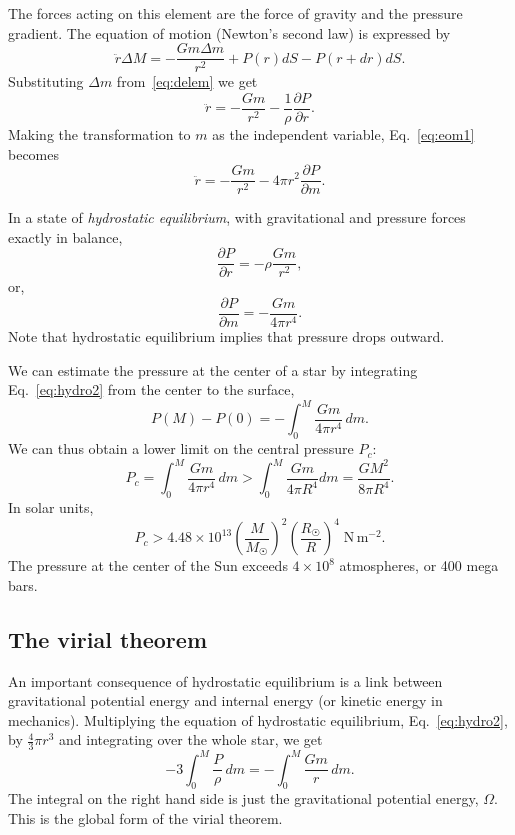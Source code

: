 \documentclass[]{article}
\newcommand{\unit}[1]{\;\mathrm{#1}}
\newcommand{\Sun}{\astrosun}
\newcommand{\di}{\partial} %
\begin{document}
The forces acting on this element are the force of gravity and the pressure
gradient. The equation of motion (Newton's second law) is expressed by
\begin{equation}
\ddot{r}\Delta{M} = -\frac{Gm\Delta{m}}{r^2} + P(r)dS - P(r+dr)dS.
\end{equation}
Substituting $\Delta{m}$ from~\eqref{eq:delem} we get
\begin{equation}\label{eq:eom1}
\ddot{r} = -\frac{Gm}{r^2} - \frac{1}{\rho}\frac{\di{P}}{\di{r}}.
\end{equation}
Making the transformation to $m$ as the independent variable,
Eq.~\eqref{eq:eom1} becomes
\begin{equation}\label{eq:eom2}
\ddot{r} = -\frac{Gm}{r^2} - 4\pi{r}^2\frac{\di{P}}{\di{m}}.
\end{equation}

In a state of \emph{hydrostatic equilibrium}, with gravitational and pressure
forces exactly in balance,
\begin{equation}
\frac{\di{P}}{\di{r}} = -\rho\frac{Gm}{r^2},
\end{equation}
or,
\begin{equation}\label{eq:hydro2}
\frac{\di{P}}{\di{m}} = -\frac{Gm}{4\pi{r}^4}.
\end{equation}
Note that hydrostatic equilibrium implies that pressure drops outward.

We can estimate the pressure at the center of a star by integrating
Eq.~\eqref{eq:hydro2} from the center to the surface,
\begin{equation}
P(M) - P(0) = -\int_0^M\frac{Gm}{4\pi{r}^4}\,dm.
\end{equation}
We can thus obtain a lower limit on the central pressure $P_c$:
\begin{equation}
P_c = \int_0^M\frac{Gm}{4\pi{r}^4}\,dm>\int_0^M\frac{Gm}{4\pi{R}^4}dm =
\frac{GM^2}{8\pi{R}^4}.
\end{equation}
In solar units,
\begin{equation}
P_c > 4.48\times10^{13}\left(\frac{M}{M_{\Sun}}\right)^2\left(\frac{R_{\Sun}}
{R}\right)^4\unit{N\,m^{-2}}.
\end{equation}
The pressure at the center of the Sun exceeds $4\times10^8$ atmospheres, or 400
mega bars.

\subsection{The virial theorem}
An important consequence of hydrostatic equilibrium is a link between
gravitational potential energy and internal energy (or kinetic energy in
mechanics). Multiplying the equation of hydrostatic equilibrium,
Eq.~\eqref{eq:hydro2}, by $\frac{4}{3}\pi{r}^3$ and integrating over the whole
star, we get
\begin{equation}\label{eq:virial}
-3\int_0^M\frac{P}{\rho}\,dm = -\int_0^M\frac{Gm}{r}\,dm.
\end{equation}
The integral on the right hand side is just the gravitational potential energy,
$\Omega$. This is the global form of the virial theorem.
\end{document}
